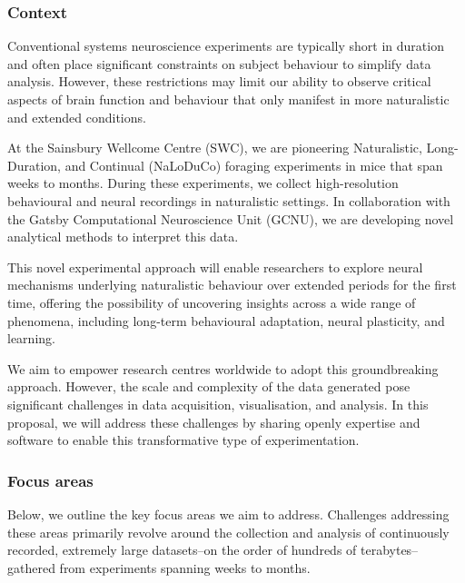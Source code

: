 \subsubsection{Context}

Conventional systems neuroscience experiments are typically short in duration
and often place significant constraints on subject behaviour to simplify data
analysis.
%
However, these restrictions may limit our ability to observe critical
aspects of brain function and behaviour that only manifest in more naturalistic
and extended conditions.

At the Sainsbury Wellcome Centre (SWC), we are pioneering Naturalistic,
Long-Duration, and Continual (NaLoDuCo) foraging experiments in mice that span
weeks to months. During these experiments, we collect high-resolution
behavioural and neural recordings in naturalistic settings. In collaboration
with the Gatsby Computational Neuroscience Unit (GCNU), we are developing novel
analytical methods to interpret this data.

This novel experimental approach will enable researchers to explore neural
mechanisms underlying naturalistic behaviour over extended periods for the first
time, offering the possibility of uncovering insights across a wide range of
phenomena, including long-term behavioural adaptation, neural plasticity, and
learning.
%

We aim to empower research centres worldwide to adopt this
groundbreaking approach.
%
However, the scale and complexity of the data generated pose significant
challenges in data acquisition, visualisation, and analysis.
%
In this proposal, we will address these challenges by sharing openly expertise
and software to enable this transformative type of experimentation.

\subsubsection{Focus areas}

Below, we outline the key focus areas we aim to address.
%
Challenges addressing these areas primarily revolve around the collection
and analysis of continuously recorded, extremely large datasets--on the order
of hundreds of terabytes--gathered from experiments spanning weeks to months.

